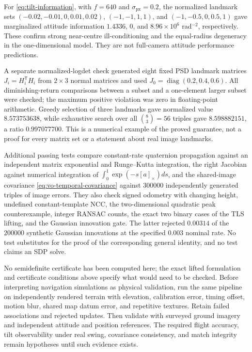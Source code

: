\documentclass[11pt,a4paper]{article}
\numberwithin{equation}{section}
\begin{document}
For \eqref{eq:tilt-information}, with $f=640$ and
$\sigma_{\mathrm{px}}=0.2$, the normalized landmark sets
$(-0.02,-0.01,0,0.01,0.02)$,
$(-1,-1,1,1)$, and $(-1,-0.5,0,0.5,1)$ gave marginalized attitude
information $1.4336$, $0$, and $8.96\times10^6$ rad$^{-2}$,
respectively. These confirm strong near-centre ill-conditioning and
the equal-radius degeneracy in the one-dimensional model. They are not
full-camera attitude performance predictions.

A separate normalized-logdet check generated eight fixed PSD landmark
matrices $J_i=H_i^{\mathsf T}H_i$ from $2\times3$ normal matrices and
used $J_0=\operatorname{diag}(0.2,0.4,0.6)$. All diminishing-return
comparisons between a subset and a one-element larger subset were
checked; the maximum positive violation was zero in floating-point
arithmetic. Greedy selection of three landmarks gave normalized value
$8.573753638$, while exhaustive search over all $\binom83=56$ triples
gave $8.598882151$, a ratio $0.997077700$. This is a numerical example
of the proved guarantee, not a proof for every matrix set or a statement
about real image landmarks.

Additional passing tests compare constant-rate quaternion propagation
against an independent matrix exponential and Runge--Kutta integration,
the right Jacobian against numerical integration of
$\int_0^1\exp(-s[a]_\times)ds$, and the shared-image covariance
\eqref{eq:vo-temporal-covariance} against $300000$ independently generated
triples of image errors. They also check signed odometry with changing
height, undefined constant-template NCC, the two-dimensional quadratic
peak counterexample, integer RANSAC counts, the exact two binary cases
of the TLS lifting, and the Gaussian innovation gate. The latter
rejected $0.00314$ of the $200000$ synthetic Gaussian innovations at
the specified $0.003$ nominal rate. No test substitutes for the proof
of the corresponding general identity, and no test claims an SDP solve.

No semidefinite certificate has been computed here; the exact lifted
formulation and certificate conditions above specify what would need
to be checked. Before interpreting navigation simulations as physical
validation, run the same pipeline on independently rendered terrain
with elevation, calibration error, timing offset, motion blur, shared
map datum error, and repetitive textures. Retain failed associations
and rejected updates. Then validate with surveyed ground imagery and
independent attitude and position references. The required flight
accuracy, tilt observability under real swing, covariance consistency,
and match integrity remain hypotheses until such evidence exists.
\end{document}
